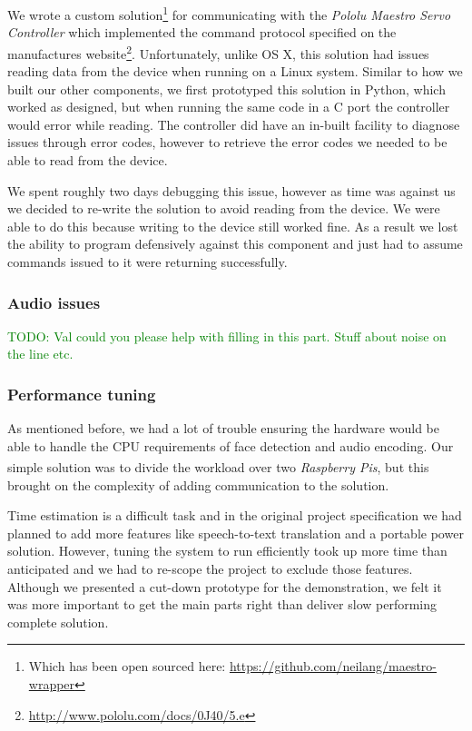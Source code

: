 \documentclass[11pt,a4paper,titlepage]{report}
\newcommand{\rpis}{\textit{Raspberry Pi\textsuperscript{\textregistered}s}}
\begin{document}
We wrote a custom solution\footnote{Which has been open sourced here: \url{https://github.com/neilang/maestro-wrapper}} for communicating with the \textit{Pololu Maestro Servo Controller} which implemented the command protocol specified on the manufactures website\footnote{\url{http://www.pololu.com/docs/0J40/5.e}}. Unfortunately, unlike OS X, this solution had issues reading data from the device when running on a Linux system. Similar to how we built our other components, we first prototyped this solution in Python, which worked as designed, but when running the same code in a C port the controller would error while reading. The controller did have an in-built facility to diagnose issues through error codes, however to retrieve the error codes we needed to be able to read from the device.

We spent roughly two days debugging this issue, however as time was against us we decided to re-write the solution to avoid reading from the device. We were able to do this because writing to the device still worked fine. As a result we lost the ability to program defensively against this component and just had to assume commands issued to it were returning successfully.

\subsubsection{Audio issues}

\textcolor{green}{TODO: Val could you please help with filling in this part. Stuff about noise on the line etc.}


\subsubsection{Performance tuning}

As mentioned before, we had a lot of trouble ensuring the hardware would be able to handle the CPU requirements of face detection and audio encoding. Our simple solution was to divide the workload over two \rpis, but this brought on the complexity of adding communication to the solution.

Time estimation is a difficult task and in the original project specification we had planned to add more features like speech-to-text translation and a portable power solution. However, tuning the system to run efficiently took up more time than anticipated and we had to re-scope the project to exclude those features. Although we presented a cut-down prototype for the demonstration, we felt it was more important to get the main parts right than deliver slow performing complete solution.
\end{document}
